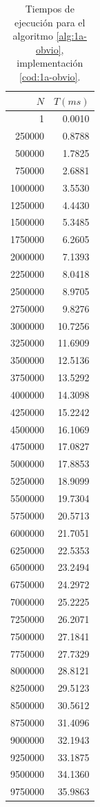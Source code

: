 \begin{table}
	\footnotesize
	\centering
	\begin{tabular}{|r|r|}
		\hline
		$N$ & $T (ms)$ \\
		\hline
		1 & 0.0010 \\ 
		250000 & 0.8788 \\ 
		500000 & 1.7825 \\ 
		750000 & 2.6881 \\ 
		1000000 & 3.5530 \\ 
		1250000 & 4.4430 \\ 
		1500000 & 5.3485 \\ 
		1750000 & 6.2605 \\ 
		2000000 & 7.1393 \\ 
		2250000 & 8.0418 \\ 
		2500000 & 8.9705 \\ 
		2750000 & 9.8276 \\ 
		3000000 & 10.7256 \\ 
		3250000 & 11.6909 \\ 
		3500000 & 12.5136 \\ 
		3750000 & 13.5292 \\ 
		4000000 & 14.3098 \\ 
		4250000 & 15.2242 \\ 
		4500000 & 16.1069 \\ 
		4750000 & 17.0827 \\ 
		5000000 & 17.8853 \\ 
		5250000 & 18.9099 \\ 
		5500000 & 19.7304 \\ 
		5750000 & 20.5713 \\ 
		6000000 & 21.7051 \\ 
		6250000 & 22.5353 \\ 
		6500000 & 23.2494 \\ 
		6750000 & 24.2972 \\ 
		7000000 & 25.2225 \\ 
		7250000 & 26.2071 \\ 
		7500000 & 27.1841 \\ 
		7750000 & 27.7329 \\ 
		8000000 & 28.8121 \\ 
		8250000 & 29.5123 \\ 
		8500000 & 30.5612 \\ 
		8750000 & 31.4096 \\ 
		9000000 & 32.1943 \\ 
		9250000 & 33.1875 \\ 
		9500000 & 34.1360 \\ 
		9750000 & 35.9863 \\
		\hline
	\end{tabular}
	
	\caption{Tiempos de ejecución para el algoritmo \ref{alg:1a-obvio}, implementación \ref{cod:1a-obvio}.}
	\label{tab:1a-obvio}
\end{table}

